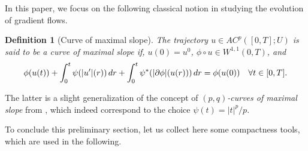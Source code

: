 \documentclass[10pt,a4paper]{amsart}
\newcommand{\dr}{{\rm d} r}
\renewcommand{\sl}{|\partial \phi|}
\newtheorem{definition}[theorem]{Definition}
\begin{document}
In this paper, we focus on the following classical notion  \cite{Muratori-Savare} in studying the evolution of gradient flows. 

\begin{definition}[Curve of maximal slope]\label{def:curve}
  The trajectory $u\in AC^p([0,T];U)$ is said to be a \emph{curve of
    maximal slope}
  if, $u(0)=u^0$, $\phi\circ u \in W^{1,1}(0,T)$, and 
  \begin{equation}
    \label{eq:curve}
    \phi(u(t)) + \int_0^t \psi(|u'|(r)) \, \dr  +   \int_0^t
    \psi^*(\sl(u(r)))\, \dr =
    \phi(u(0)) \quad \forall t \in [0,T].
  \end{equation}
\end{definition}

The latter is a slight generalization of the concept of {\it $(p,q)$-curves
of maximal slope} from \cite[Def.~1.3.2, p.~32]{Ambrosio08},
which indeed correspond to the choice $\psi(t)=|t|^p/p$.

To conclude this preliminary section,  let us collect here some compactness tools,
which are used in the following.
\end{document}
